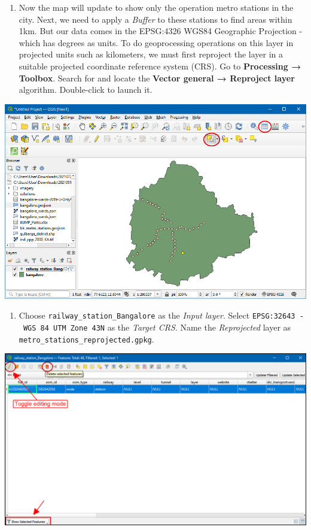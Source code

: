 \documentclass[
  12pt,
  a4paper]{article}
\providecommand{\tightlist}{%
  \setlength{\itemsep}{0pt}\setlength{\parskip}{0pt}}
\begin{document}
\begin{enumerate}
\def\labelenumi{\arabic{enumi}.}
\setcounter{enumi}{4}
\tightlist
\item
  Now the map will update to show only the operation metro stations in
  the city. Next, we need to apply a \emph{Buffer} to these stations to
  find areas within 1km. But our data comes in the EPSG:4326 WGS84
  Geographic Projection - which has degrees as units. To do
  geoprocessing operations on this layer in projected units such as
  kilometers, we must first reproject the layer in a suitable projected
  coordinate reference system (CRS). Go to \textbf{Processing →
  Toolbox}. Search for and locate the \textbf{Vector general → Reproject
  layer} algorithm. Double-click to launch it.
\end{enumerate}

\begin{center}\includegraphics[width=0.75\linewidth]{images/spatial_data_viz/pop5} \end{center}

\begin{enumerate}
\def\labelenumi{\arabic{enumi}.}
\setcounter{enumi}{5}
\tightlist
\item
  Choose \texttt{railway\_station\_Bangalore} as the \emph{Input layer}.
  Select \texttt{EPSG:32643\ -\ WGS\ 84\ UTM\ Zone\ 43N} as the
  \emph{Target CRS}. Name the \emph{Reprojected} layer as
  \texttt{metro\_stations\_reprojected.gpkg}.
\end{enumerate}

\begin{center}\includegraphics[width=0.75\linewidth]{images/spatial_data_viz/pop6} \end{center}
\end{document}
